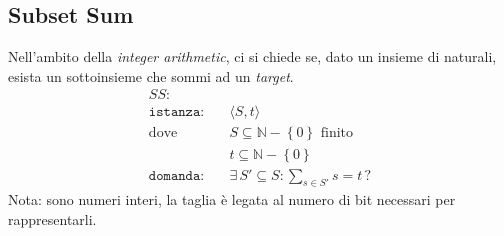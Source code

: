 \subsection{Subset Sum}
\label{sss:subsetsum}
Nell'ambito della \emph{integer arithmetic}, ci si chiede se, dato un insieme di naturali, esista un sottoinsieme che sommi ad un \emph{target}.
\begin{align*}
    SS: & \\
    \texttt{istanza:} \quad & \langle S,t \rangle \\
    \text{dove} \quad & S \subseteq \mathbb{N} - \left\{ 0 \right\} \text{ finito} \\
    & t \subseteq \mathbb{N} - \left\{ 0 \right\} \\
    \texttt{domanda:} \quad & \exists \, S' \subseteq S : \sum_{s \in S'}^{} s = t \, ?
\end{align*}
Nota: sono numeri interi, la taglia è legata al numero di bit necessari per rappresentarli.

